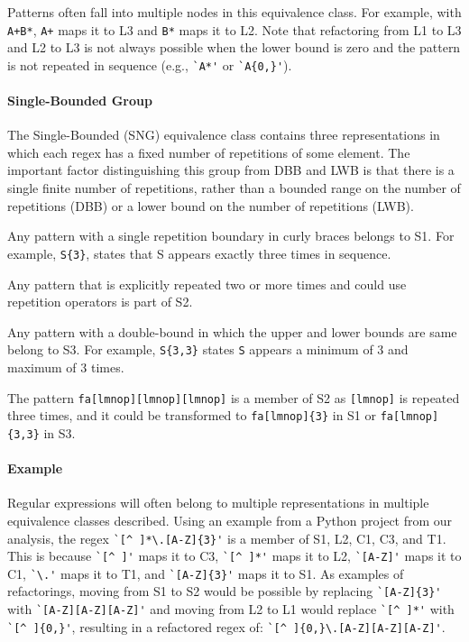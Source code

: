 Patterns often fall into multiple nodes in this equivalence class. For example, with \verb!A+B*!,  \verb!A+! maps it to L3 and \verb!B*! maps it to L2. Note that refactoring from L1 to L3 and L2 to L3 is not always possible when the lower bound is zero and the pattern is not repeated in sequence (e.g., \verb!`A*'! or \verb!`A{0,}'!).

\paragraph{Single-Bounded Group} 
The Single-Bounded (SNG) equivalence class contains  three representations in which each regex has a fixed number of repetitions of some element. The important factor distinguishing this group from DBB and LWB is that there is a single finite number of repetitions, rather than a bounded range on the number of repetitions (DBB) or a lower bound on the number of repetitions (LWB).


\begin{description}  \itemsep -1pt
\item[S1:] Any pattern with a single repetition boundary in curly braces belongs to S1. For example,   \verb!S{3}!, states that S appears exactly three times in sequence.
\item[S2:] Any pattern that is explicitly repeated two or more times and could use repetition operators is part of S2.
\item[S3:] Any pattern with a double-bound in which the upper and lower bounds are same belong to S3. For example, \verb!S{3,3}! states \verb!S! appears a minimum of 3 and maximum of 3 times.
\end{description}

The pattern \verb!fa[lmnop][lmnop][lmnop]! is a member of S2 as \verb![lmnop]! is repeated three times, and it could be transformed to \verb!fa[lmnop]{3}! in S1 or \verb!fa[lmnop]{3,3}! in S3.

\paragraph{Example}
Regular expressions will often belong to multiple representations in multiple equivalence classes described.
Using an example from a Python project from our analysis, the regex \verb!`[^ ]*\.[A-Z]{3}'! is a member of S1, L2, C1, C3, and T1. This is because \verb!`[^ ]'! maps it to C3, \verb!`[^ ]*'! maps it to L2, \verb!`[A-Z]'! maps it to C1, \verb!`\.'! maps it to T1, and \verb!`[A-Z]{3}'! maps it to S1.
As examples of refactorings, moving from S1 to S2 would be possible by replacing  \verb!`[A-Z]{3}'! with  \verb!`[A-Z][A-Z][A-Z]'! and moving from L2 to L1 would replace \verb!`[^ ]*'! with \verb!`[^ ]{0,}'!, resulting in a refactored regex of:  \verb!`[^ ]{0,}\.[A-Z][A-Z][A-Z]'!.


